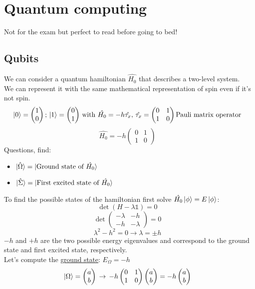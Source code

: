 \graphicspath{{chapters/08/}}
\chapter{Quantum computing}
Not for the exam but perfect to read before going to bed!
\section{Qubits}
We can consider a quantum hamiltonian $\hat{H_0}$ that describes a two-level system. We can represent it with the same mathematical representation of spin even if it's not spin.
\[
\ket{0}=\begin{pmatrix}1\\0\end{pmatrix};\,
\ket{1}=\begin{pmatrix}0\\1\end{pmatrix}\,
\text{with}\,
\,\hat{H_0}=-h\hat{\tau_x},\,
\hat{\tau_x}=\begin{pmatrix}0&1\\1&0\end{pmatrix}
\text{Pauli matrix operator}
\]
\[
\hat{H_0}=-h\begin{pmatrix}0&1\\1&0\end{pmatrix}
\]
Questions, find:
\begin{itemize}
	\item$\ket{\hat{\Omega}}=\ket{\text{Ground state of }\hat{H_0}}$
	\item$\ket{\hat{\Sigma}}=\ket{\text{First excited state of }\hat{H_0}}$
\end{itemize}
To find the possible states of the hamiltonian first solve $\hat{H_0}\ket{\phi}=E\ket{\phi}$:
\[\det(H-\lambda \mathbb{1})=0\]
\[\det\begin{pmatrix}-\lambda&-h\\-h&-\lambda\end{pmatrix}=0\]
\[\lambda^2-h^2=0 \rightarrow \lambda=\pm h\]
$-h$ and $+h$ are the two possible energy eigenvalues and correspond to the ground state and first excited state, respectively.\\
Let's compute the \ul{ground state}: $E_\Omega=-h$
\[\ket{\Omega}=\begin{pmatrix}a\\b\end{pmatrix}\,\rightarrow\,
-h\begin{pmatrix}0&1\\1&0\end{pmatrix}\begin{pmatrix}a\\b\end{pmatrix}=-h\begin{pmatrix}a\\b\end{pmatrix}\]
